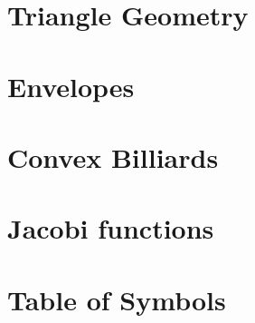 \chapter{Triangle Geometry}
\label{app:app-triangle}


\chapter{Envelopes}
\label{app:app-envelope}


\chapter{Convex Billiards}
\label{app:app-convex}
  


\chapter{Jacobi functions}
\label{app:jacobi-functions}
  

\chapter{Table of Symbols}
\label{app:app-symbols}
